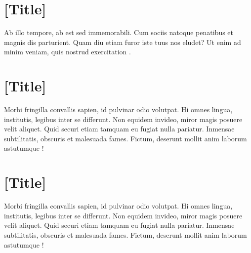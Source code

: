 \begin{anexosenv}
  \chapter{[Title]}

  Ab illo tempore, ab est sed immemorabili. Cum sociis natoque penatibus et magnis dis parturient. Quam diu etiam furor iste tuus nos eludet? Ut enim ad minim veniam, quis nostrud exercitation \autocite{gilbert2009}.

  \chapter{[Title]}

  Morbi fringilla convallis sapien, id pulvinar odio volutpat. Hi omnes lingua, institutis, legibus inter se differunt. Non equidem invideo, miror magis posuere velit aliquet. Quid securi etiam tamquam eu fugiat nulla pariatur. Inmensae subtilitatis, obscuris et malesuada fames. Fictum, deserunt mollit anim laborum astutumque \autocite{kornhauser2009}!

  \chapter{[Title]}

  Morbi fringilla convallis sapien, id pulvinar odio volutpat. Hi omnes lingua, institutis, legibus inter se differunt. Non equidem invideo, miror magis posuere velit aliquet. Quid securi etiam tamquam eu fugiat nulla pariatur. Inmensae subtilitatis, obscuris et malesuada fames. Fictum, deserunt mollit anim laborum astutumque \autocite{romero2023}!

\end{anexosenv}


